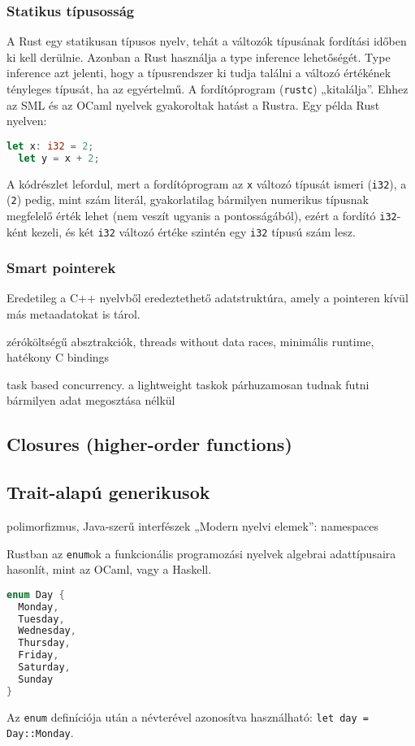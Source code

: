 \subsubsection{Statikus típusosság}
A Rust egy statikusan típusos nyelv, tehát a változók típusának fordítási időben ki kell derülnie. Azonban a Rust használja a type inference lehetőségét. Type inference azt jelenti, hogy a típusrendszer ki tudja találni a változó értékének tényleges típusát, ha az egyértelmű. A fordítóprogram (\lstinline{rustc}) „kitalálja”. Ehhez az SML és az OCaml nyelvek gyakoroltak hatást a Rustra. Egy példa Rust nyelven:
\begin{lstlisting}[language=Rust, style=boxed]
  let x: i32 = 2;
  let y = x + 2;
\end{lstlisting}
A kódrészlet lefordul, mert a fordítóprogram az \lstinline{x} változó típusát ismeri (\lstinline{i32}), a (\lstinline{2}) pedig, mint szám literál, gyakorlatilag bármilyen numerikus típusnak megfelelő érték lehet (nem veszít ugyanis a pontosságából), ezért a fordító \lstinline{i32}-ként kezeli, és két \lstinline{i32} változó értéke szintén egy \lstinline{i32} típusú szám lesz.

\subsubsection{Smart pointerek}
Eredetileg a C++ nyelvből eredeztethető adatstruktúra, amely a pointeren kívül más metaadatokat is tárol.

zéróköltségű absztrakciók, threads without data races, minimális runtime, hatékony C bindings

task based concurrency. a lightweight taskok párhuzamosan tudnak futni bármilyen adat megosztása nélkül

\subsection{Closures (higher-order functions)}

\subsection{Trait-alapú generikusok}

polimorfizmus, Java-szerű interfészek
„Modern nyelvi elemek”: namespaces

Rustban az \lstinline{enum}ok a funkcionális programozási nyelvek algebrai adattípusaira hasonlít, mint az OCaml, vagy a Haskell.
\begin{lstlisting}[language=Rust, style=boxed]
enum Day {
  Monday,
  Tuesday,
  Wednesday,
  Thursday,
  Friday,
  Saturday,
  Sunday
}
\end{lstlisting}
Az \lstinline{enum} definíciója után a névterével azonosítva használható: \lstinline{let day = Day::Monday}.

